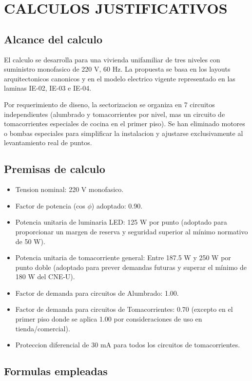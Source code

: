 \chapter{CALCULOS JUSTIFICATIVOS}

\section{Alcance del calculo}

El calculo se desarrolla para una vivienda unifamiliar de tres niveles con suministro monofasico de 220 V, 60 Hz. La propuesta se basa en los layouts arquitectonicos canonicos y en el modelo electrico vigente representado en las laminas IE-02, IE-03 e IE-04.

Por requerimiento de diseno, la sectorizacion se organiza en 7 circuitos independientes (alumbrado y tomacorrientes por nivel, mas un circuito de tomacorrientes especiales de cocina en el primer piso). Se han eliminado motores o bombas especiales para simplificar la instalacion y ajustarse exclusivamente al levantamiento real de puntos.

\section{Premisas de calculo}

\begin{itemize}
  \item Tension nominal: 220 V monofasico.
  \item Factor de potencia (cos $\phi$) adoptado: 0.90.
  \item Potencia unitaria de luminaria LED: 125 W por punto (adoptado para proporcionar un margen de reserva y seguridad superior al mínimo normativo de 50 W).
  \item Potencia unitaria de tomacorriente general: Entre 187.5 W y 250 W por punto doble (adoptado para prever demandas futuras y superar el mínimo de 180 W del CNE-U).
  \item Factor de demanda para circuitos de Alumbrado: 1.00.
  \item Factor de demanda para circuitos de Tomacorrientes: 0.70 (excepto en el primer piso donde se aplica 1.00 por consideraciones de uso en tienda/comercial).
  \item Proteccion diferencial de 30 mA para todos los circuitos de tomacorrientes.
\end{itemize}

\section{Formulas empleadas}


